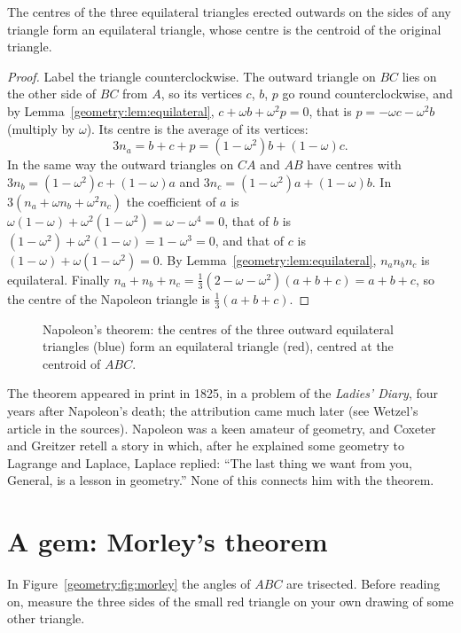 \begin{theorem}\label{geometry:thm:napoleon}
The centres of the three equilateral triangles erected outwards on the sides of any triangle form an equilateral triangle, whose centre is
the centroid of the original triangle.
\end{theorem}
\begin{proof}
Label the triangle counterclockwise. The outward triangle on $BC$ lies on the other side of $BC$ from $A$, so its vertices $c$, $b$, $p$
go round counterclockwise, and by Lemma~\ref{geometry:lem:equilateral}, $c+\omega b+\omega^2p=0$, that is $p=-\omega c-\omega^2b$ (multiply by
$\omega$). Its centre is the average of its vertices:
\[
3n_a=b+c+p=(1-\omega^2)b+(1-\omega)c.
\]
In the same way the outward triangles on $CA$ and $AB$ have centres with $3n_b=(1-\omega^2)c+(1-\omega)a$ and
$3n_c=(1-\omega^2)a+(1-\omega)b$. In $3(n_a+\omega n_b+\omega^2n_c)$ the coefficient of $a$ is $\omega(1-\omega)+\omega^2(1-\omega^2)=
\omega-\omega^4=0$, that of $b$ is $(1-\omega^2)+\omega^2(1-\omega)=1-\omega^3=0$, and that of $c$ is $(1-\omega)+\omega(1-\omega^2)=0$.
By Lemma~\ref{geometry:lem:equilateral}, $n_an_bn_c$ is equilateral. Finally $n_a+n_b+n_c=\frac13(2-\omega-\omega^2)(a+b+c)=a+b+c$, so the centre of
the Napoleon triangle is $\frac13(a+b+c)$.
\end{proof}

\begin{figure}[ht]
\centering
{}
\caption{Napoleon's theorem: the centres of the three outward equilateral triangles (blue) form an equilateral triangle (red), centred at
the centroid of $ABC$.}
\label{geometry:fig:napoleon}
\end{figure}

The theorem appeared in print in 1825, in a problem of the \emph{Ladies' Diary}, four years after Napoleon's death; the attribution came
much later (see Wetzel's article in the sources). Napoleon was a keen amateur of geometry, and Coxeter and Greitzer retell a story
in which, after he explained some geometry to Lagrange and Laplace, Laplace replied: ``The last thing we want from you, General, is a
lesson in geometry.'' None of this connects him with the theorem.

\section{A gem: Morley's theorem}

\begin{think}
In Figure~\ref{geometry:fig:morley} the angles of $ABC$ are trisected. Before reading on, measure the three sides of the small red triangle on
your own drawing of some other triangle.
\end{think}

